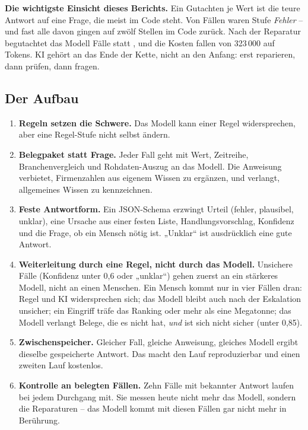 \documentclass[11pt,a4paper]{article}
\newcommand{\befund}[1]{%
  \par\vspace{2pt}\noindent\colorbox{softgrey}{%
  \begin{minipage}{\dimexpr\linewidth-2\fboxsep}\small\vspace{3pt}#1\vspace{3pt}\end{minipage}}\par\vspace{4pt}}
\begin{document}
\befund{\textbf{Die wichtigste Einsicht dieses Berichts.} Ein Gutachten je Wert ist die teure Antwort auf eine Frage, die meist im Code steht. Von \vorFlags{} Fällen waren \vorFehler{} Stufe \emph{Fehler} -- und fast alle davon gingen auf zwölf Stellen im Code zurück. Nach der Reparatur begutachtet das Modell \statFlags{} Fälle statt \vorFlags{}, und die Kosten fallen von 323\,000 auf \kiTokens{} Tokens. KI gehört an das Ende der Kette, nicht an den Anfang: erst reparieren, dann prüfen, dann fragen.}

\subsection{Der Aufbau}

\begin{enumerate}
\item \textbf{Regeln setzen die Schwere.} Das Modell kann einer Regel widersprechen, aber eine Regel-Stufe nicht selbst ändern.
\item \textbf{Belegpaket statt Frage.} Jeder Fall geht mit Wert, Zeitreihe, Branchenvergleich und Rohdaten-Auszug an das Modell. Die Anweisung verbietet, Firmenzahlen aus eigenem Wissen zu ergänzen, und verlangt, allgemeines Wissen zu kennzeichnen.
\item \textbf{Feste Antwortform.} Ein JSON-Schema erzwingt Urteil (fehler, plausibel, unklar), eine Ursache aus einer festen Liste, Handlungsvorschlag, Konfidenz und die Frage, ob ein Mensch nötig ist. „Unklar“ ist ausdrücklich eine gute Antwort.
\item \textbf{Weiterleitung durch eine Regel, nicht durch das Modell.} Unsichere Fälle (Konfidenz unter 0{,}6 oder „unklar“) gehen zuerst an ein stärkeres Modell, nicht an einen Menschen. Ein Mensch kommt nur in vier Fällen dran: Regel und KI widersprechen sich; das Modell bleibt auch nach der Eskalation unsicher; ein Eingriff träfe das Ranking oder mehr als eine Megatonne; das Modell verlangt Belege, die es nicht hat, \emph{und} ist sich nicht sicher (unter 0{,}85).
\item \textbf{Zwischenspeicher.} Gleicher Fall, gleiche Anweisung, gleiches Modell ergibt dieselbe gespeicherte Antwort. Das macht den Lauf reproduzierbar und einen zweiten Lauf kostenlos.
\item \textbf{Kontrolle an belegten Fällen.} Zehn Fälle mit bekannter Antwort laufen bei jedem Durchgang mit. Sie messen heute nicht mehr das Modell, sondern die Reparaturen -- das Modell kommt mit diesen Fällen gar nicht mehr in Berührung.
\end{enumerate}
\end{document}
